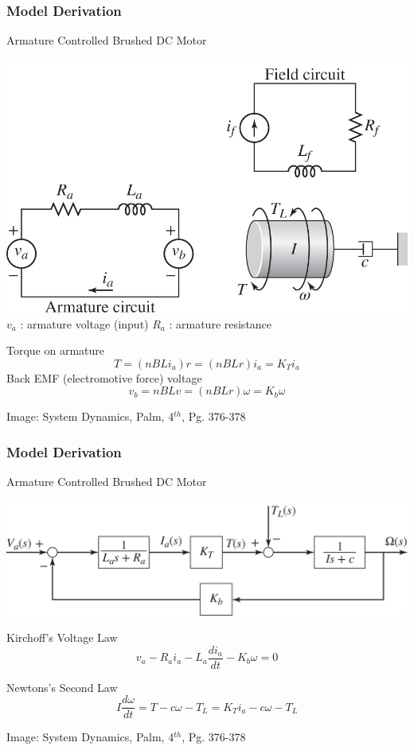 \documentclass[fleqn]{beamer}                  %
\newcommand{\sectiontitleII}{Model Derivation}
\begin{document}
	\begin{frame}[label=sectionII,containsverbatim] \small
        \frametitle{\sectiontitleII}
		Armature Controlled Brushed DC Motor \vspc

		\begin{multicols}{2}

		\includegraphics[scale=.70]{paL40056_06_05_04_cropped.png}\vspace{5mm}\\

		\small
		$v_a$ : armature voltage (input)\vspc
        $R_a$ : armature resistance

        Torque on armature
        \[T=\left(nBLi_a \right)r=\left(nBLr\right)i_a=K_Ti_a \] 
        Back EMF (electromotive force) voltage
        \[v_b=nBLv=\left(nBLr\right)\omega=K_b\omega \]	

        \end{multicols}

		\btVFill
		\tiny{Image: System Dynamics, Palm, 4$^{th}$, Pg. 376-378}
		
	\end{frame}

	\begin{frame}[label=sectionII,containsverbatim] \small
        \frametitle{\sectiontitleII}
		Armature Controlled Brushed DC Motor \vspc

		\includegraphics[scale=.65]{paL40056_06_05_05_cropped.png}

        Kirchoff's Voltage Law 
        \[ v_a-R_ai_a-L_a\frac{di_a}{dt}-K_b\omega=0 \] 

        Newtons's Second Law  
        \[ I\frac{d\omega}{dt}=T-c\omega-T_L=K_Ti_a-c\omega-T_L \]	

		\btVFill
		\tiny{Image: System Dynamics, Palm, 4$^{th}$, Pg. 376-378}
		
	\end{frame}	
\end{document}
